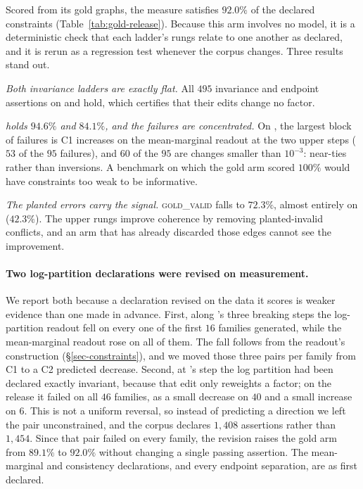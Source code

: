 Scored from its gold graphs, the measure satisfies $92.0\%$ of the declared constraints
(Table~\ref{tab:gold-release}). Because this arm involves no model, it is a deterministic check that each ladder's
rungs relate to one another as declared, and it is rerun as a regression test whenever the corpus changes. Three
results stand out.

\emph{Both invariance ladders are exactly flat.} All $495$ invariance and endpoint assertions on 
and  hold, which certifies that their edits change no factor.

\emph{ holds $94.6\%$ and  $84.1\%$, and the failures are concentrated.} On
, the largest block of failures is C1 increases on the mean-marginal readout at the two upper
steps ($53$ of the $95$ failures), and $60$ of the $95$ are changes smaller than $10^{-3}$: near-ties rather than
inversions. A benchmark on which the gold arm scored $100\%$ would have constraints too weak to be informative.

\emph{The planted errors carry the  signal.} \textsc{gold\_valid} falls to $72.3\%$, almost
entirely on  ($42.3\%$). The upper  rungs improve coherence by removing
planted-invalid conflicts, and an arm that has already discarded those edges cannot see the improvement.

\paragraph{Two log-partition declarations were revised on measurement.} We report both because a declaration
revised on the data it scores is weaker evidence than one made in advance. First, along 's three
breaking steps the log-partition readout fell on every one of the first $16$ families generated, while the
mean-marginal readout rose on all of them. The fall follows from the readout's construction
(\S\ref{sec-constraints}), and we moved those three pairs per family from C1 to a C2 predicted decrease. Second, at
's  step the log partition had been declared exactly invariant,
because that edit only reweights a factor; on the release it failed on all $46$ families, as a small decrease on
$40$ and a small increase on $6$. This is not a uniform reversal, so instead of predicting a direction we left the
pair unconstrained, and the corpus declares $1{,}408$ assertions rather than $1{,}454$. Since that pair failed on
every family, the revision raises the gold arm from $89.1\%$ to $92.0\%$ without changing a single passing
assertion. The mean-marginal and consistency declarations, and every endpoint separation, are as first declared.

